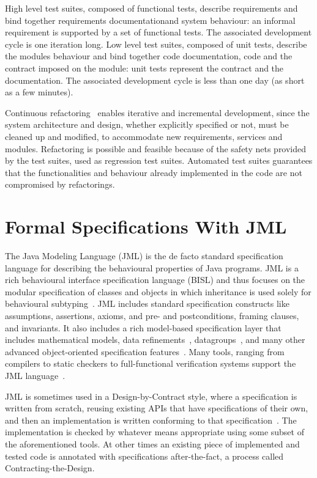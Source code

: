 \documentclass[english]{lni}
\begin{document}
High level test suites, composed of functional tests, describe requirements and bind together requirements documentationand system behaviour: an informal requirement is supported by a set of functional tests. 
The associated development cycle is one iteration long. 
Low level test suites, composed of unit tests, describe the modules behaviour and bind together code documentation, code and the contract imposed on the module: unit tests represent the contract and the documentation. 
The associated development cycle is less than one day (as short as a few minutes).

Continuous refactoring~\cite{Fowler1999} enables iterative and incremental development, since the system architecture and design, whether explicitly specified or not, must be cleaned up and modified, to accommodate new requirements, services and modules.
Refactoring is possible and feasible because of the safety nets provided by the test suites, used as regression test suites.
Automated test suites guarantees that the functionalities and behaviour already implemented in the code are not compromised by refactorings.



\section{Formal Specifications With JML}
\label{sec:formal_specifications_using_jml}

The Java Modeling Language (JML) is the de facto standard
specification language for describing the behavioural properties of
Java programs.  JML is a rich behavioural interface specification
language (BISL) and thus focuses on the modular specification of
classes and objects in which inheritance is used solely for
behavioural subtyping~\cite{LeavensBakerRuby99}.  JML includes
standard specification constructs like assumptions, assertions,
axioms, and pre- and postconditions, framing clauses, and invariants.
It also includes a rich model-based specification layer that includes
mathematical models, data refinements~\cite{}, datagroups~\cite{}, and
many other advanced object-oriented specification
features~\cite{chalin06:_beyon_asser}.  Many tools, ranging from
compilers to static checkers to full-functional verification systems
support the JML language~\cite{BurdyEtal05-STTT}.

JML is sometimes used in a Design-by-Contract style, where a
specification is written from scratch, reusing existing APIs that have
specifications of their own, and then an implementation is written
conforming to that specification~\cite{Meyer92b}.  The
implementation is checked by whatever means appropriate using some
subset of the aforementioned tools.  At other times an existing piece
of implemented and tested code is annotated with specifications
after-the-fact, a process called Contracting-the-Design.
\end{document}
